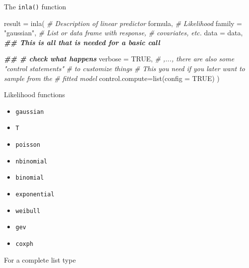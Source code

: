 \documentclass[
  handout]{beamer}
\newenvironment{Shaded}{\begin{snugshade}}{\end{snugshade}}
\newcommand{\AttributeTok}[1]{\textcolor[rgb]{0.77,0.63,0.00}{#1}}
\newcommand{\CommentTok}[1]{\textcolor[rgb]{0.56,0.35,0.01}{\textit{#1}}}
\newcommand{\ConstantTok}[1]{\textcolor[rgb]{0.00,0.00,0.00}{#1}}
\newcommand{\DocumentationTok}[1]{\textcolor[rgb]{0.56,0.35,0.01}{\textbf{\textit{#1}}}}
\newcommand{\FunctionTok}[1]{\textcolor[rgb]{0.00,0.00,0.00}{#1}}
\newcommand{\NormalTok}[1]{#1}
\newcommand{\OtherTok}[1]{\textcolor[rgb]{0.56,0.35,0.01}{#1}}
\newcommand{\SpecialCharTok}[1]{\textcolor[rgb]{0.00,0.00,0.00}{#1}}
\newcommand{\StringTok}[1]{\textcolor[rgb]{0.31,0.60,0.02}{#1}}
\begin{document}
\begin{frame}[fragile]{The \texttt{inla()} function}
\protect\hypertarget{the-inla-function}{}
\small

\begin{Shaded}
\begin{Highlighting}[]
\NormalTok{result }\OtherTok{=} \FunctionTok{inla}\NormalTok{(}
  \CommentTok{\# Description of linear predictor}
\NormalTok{  formula,}
  \CommentTok{\# Likelihood}
  \AttributeTok{family =} \StringTok{"gaussian"}\NormalTok{,}
  \CommentTok{\# List or data frame with response, }
  \CommentTok{\# covariates, etc. }
  \AttributeTok{data =}\NormalTok{ data,}
  \DocumentationTok{\#\# This is all that is needed for a basic call }

  \DocumentationTok{\#\# \# check what happens}
  \AttributeTok{verbose =} \ConstantTok{TRUE}\NormalTok{,}
  \CommentTok{\# ,..., there are also some "control statements"}
  \CommentTok{\# to customize things}
  \CommentTok{\# This you need if you later want to sample from the}
  \CommentTok{\# fitted model}
  \AttributeTok{control.compute=}\FunctionTok{list}\NormalTok{(}\AttributeTok{config =} \ConstantTok{TRUE}\NormalTok{)}
\NormalTok{  )}
\end{Highlighting}
\end{Shaded}

\normalsize
\end{frame}

\begin{frame}[fragile]{Likelihood functions}
\protect\hypertarget{likelihood-functions}{}
\begin{itemize}
\item
  \texttt{gaussian}
\item
  \texttt{T}
\item
  \texttt{poisson}
\item
  \texttt{nbinomial}
\item
  \texttt{binomial}
\item
  \texttt{exponential}
\item
  \texttt{weibull}
\item
  \texttt{gev}
\item
  \texttt{coxph}
\end{itemize}

For a complete list type

\begin{Shaded}
\end{Shaded}
\end{frame}
\end{document}
